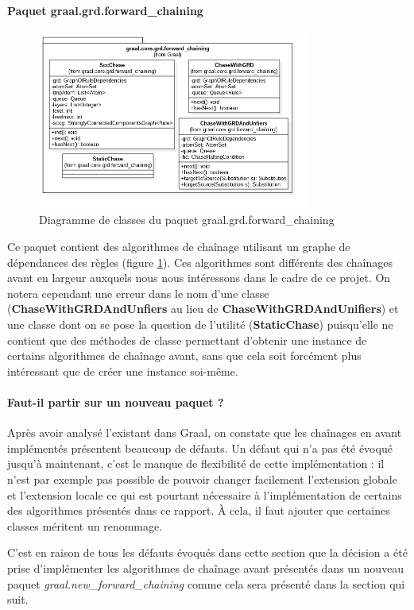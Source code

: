         
        \paragraph{Paquet graal.grd.forward\_chaining} 
        \begin{figure}[H]
        \centering
        \vspace{-15pt}
        \includegraphics[width=0.8\textwidth]{pictures/diag_class_grd_forard_chaining.png}
        \vspace{-30pt}
        \caption{Diagramme de classes du paquet graal.grd.forward\_chaining}
        \label{fig:dclasse_grd_forward_chaining}
        \end{figure}
        Ce paquet contient des algorithmes de chaînage utilisant un graphe de dépendances des règles (figure \ref{fig:dclasse_grd_forward_chaining}). Ces algorithmes sont différents des chaînages avant en largeur auxquels nous nous intéressons dans le cadre de ce projet. On notera cependant une erreur dans le nom d'une classe (\textbf{ChaseWithGRDAndUnfiers} au lieu de \textbf{ChaseWithGRDAndUnifiers}) et une classe dont on se pose la question de l'utilité (\textbf{StaticChase}) puisqu'elle ne contient que des méthodes de classe permettant d'obtenir une instance de certains algorithmes de chaînage avant, sans que cela soit forcément plus intéressant que de créer une instance soi-même.
        
        \paragraph{Faut-il partir sur un nouveau paquet ?} Après avoir analysé l'existant dans Graal, on constate que les chaînages en avant implémentés présentent beaucoup de défauts. Un défaut qui n'a pas été évoqué jusqu'à maintenant, c'est le manque de flexibilité de cette implémentation : il n'est par exemple pas possible de pouvoir changer facilement l'extension globale et l'extension locale ce qui est pourtant nécessaire à l'implémentation de certains des algorithmes présentés dans ce rapport. À cela, il faut ajouter que certaines classes méritent un renommage.
        \par C'est en raison de tous les défauts évoqués dans cette section que la décision a été prise d'implémenter les algorithmes de chaînage avant présentés dans un nouveau paquet \textit{graal.new\_forward\_chaining} comme cela sera présenté dans la section qui suit.
        
